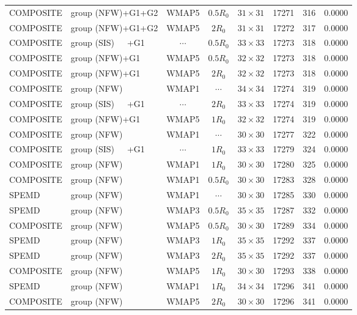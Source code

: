 \documentclass[useAMS,usenatbib]{mnras}
\def\nomicro{$\cdots$}
\def\nodata{$\cdots$}
\begin{document}
\begin{table}
\begin{tabular}{llccccrr}
        COMPOSITE & group (NFW)+G1+G2 &WMAP5 & $0.5R_{0}$&$31\times31$ & 17271 & 316 & 0.0000\\
        COMPOSITE & group (NFW)+G1+G2 &WMAP5 & $2R_{0}$  &$31\times31$ & 17272 & 317 & 0.0000\\
        COMPOSITE & group (SIS)~~~+G1 &\nodata & $0.5R_{0}$&$33\times33$ & 17273 & 318 & 0.0000\\
        COMPOSITE & group (NFW)+G1    &WMAP5 & $0.5R_{0}$&$32\times32$ & 17273 & 318 & 0.0000\\
        COMPOSITE & group (NFW)+G1    &WMAP5 & $2R_{0}$  &$32\times32$ & 17273 & 318 & 0.0000\\
        COMPOSITE & group (NFW)       &WMAP1 & \nomicro&$34\times34$ & 17274 & 319 & 0.0000\\
        COMPOSITE & group (SIS)~~~+G1 &\nodata&$2R_{0}$ &$33\times33$ & 17274 & 319 & 0.0000\\
        COMPOSITE & group (NFW)+G1    &WMAP5 & $1R_{0}$&$32\times32$ & 17274 & 319 & 0.0000\\
        COMPOSITE & group (NFW)       &WMAP1 & \nomicro&$30\times30$ & 17277 & 322 & 0.0000\\
        COMPOSITE & group (SIS)~~~+G1 &\nodata&$1R_{0}$ &$33\times33$ & 17279 & 324 & 0.0000\\
        COMPOSITE & group (NFW)       &WMAP1 & $1R_{0}$&$30\times30$ & 17280 & 325 & 0.0000\\
        COMPOSITE & group (NFW)       &WMAP1 & $0.5R_{0}$&$30\times30$ & 17283 & 328 & 0.0000\\
        SPEMD     & group (NFW)       &WMAP1 & \nomicro&$30\times30$ & 17285 & 330 & 0.0000\\
        SPEMD     & group (NFW)       &WMAP3 & $0.5R_{0}$&$35\times35$ & 17287 & 332 & 0.0000\\
        COMPOSITE & group (NFW)       &WMAP5 & $0.5R_{0}$&$30\times30$ & 17289 & 334 & 0.0000\\
        SPEMD     & group (NFW)       &WMAP3 & $1R_{0}$&$35\times35$ & 17292 & 337 & 0.0000\\
        SPEMD     & group (NFW)       &WMAP3 & $2R_{0}$&$35\times35$ & 17292 & 337 & 0.0000\\
        COMPOSITE & group (NFW)       &WMAP5 & $1R_{0}$&$30\times30$ & 17293 & 338 & 0.0000\\
        SPEMD     & group (NFW)       &WMAP1 & $1R_{0}$&$34\times34$ & 17296 & 341 & 0.0000\\
        COMPOSITE & group (NFW)       &WMAP5 & $2R_{0}$&$30\times30$ & 17296 & 341 & 0.0000\\

\end{tabular}
\end{table}
\end{document}
